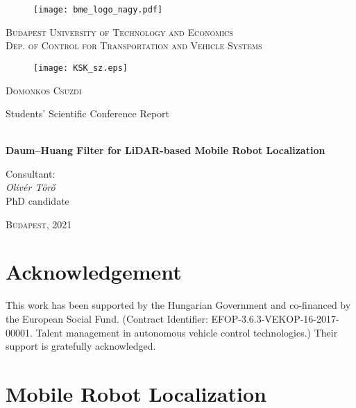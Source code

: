 \documentclass[a4paper, 12pt]{paper}
\begin{document}
\begin{center}
    \begin{figure}[!h]
        \centering
        \texttt{[image: bme\_logo\_nagy.pdf]}
    \end{figure}
    \large\textsc{Budapest University of Technology and Economics\\
        Dep. of Control for Transportation
        and Vehicle Systems}
    \begin{figure}[!h]
        \centering
        \texttt{[image: KSK\_sz.eps]}
    \end{figure}
\end{center}
\thispagestyle{empty}
{\centering

    {\LARGE\textsc{Domonkos Csuzdi}

        \LARGE{Students' Scientific Conference Report}}

    {\Large\textbf{\\Daum--Huang Filter for LiDAR-based Mobile Robot Localization}}\\

    }

\begin{flushleft}
    \begin{minipage}{0.3\linewidth}
        \large{Consultant}:\\
        \forceindent \textit{Olivér Törő}\\
        \forceindent PhD candidate
    \end{minipage}
\end{flushleft}



\begin{center}
    {\Large\textsc{Budapest, }2021 }
\end{center}
\newpage
\thispagestyle{empty}
\newpage
\section*{Acknowledgement}
This work has been supported by the Hungarian Government and co-financed by the European Social Fund. (Contract Identifier: EFOP-3.6.3-VEKOP-16-2017-00001. Talent management in autonomous vehicle control technologies.) Their support is gratefully acknowledged.
\clearpage

\pagestyle{fancy}
\section{Mobile Robot Localization}
\thispagestyle{fancy}



\end{document}
